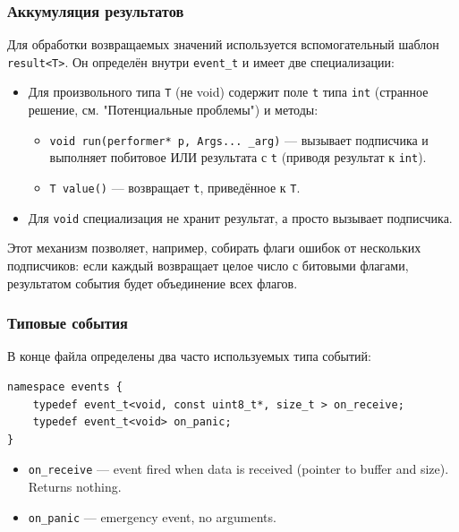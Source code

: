 \documentclass[a4paper,12pt]{article}
\begin{document}
\subsubsection{Аккумуляция результатов}

Для обработки возвращаемых значений используется вспомогательный шаблон \texttt{result<T>}. Он определён внутри \texttt{event\_t} и имеет две специализации:

\begin{itemize}
    \item Для произвольного типа \texttt{T} (не void) содержит поле \texttt{t} типа \texttt{int} (странное решение, см. "Потенциальные проблемы") и методы:
        \begin{itemize}
            \item \texttt{void run(performer* p, Args... \_arg)} — вызывает подписчика и выполняет побитовое ИЛИ результата с \texttt{t} (приводя результат к \texttt{int}).
            \item \texttt{T value()} — возвращает \texttt{t}, приведённое к \texttt{T}.
        \end{itemize}
    \item Для \texttt{void} специализация не хранит результат, а просто вызывает подписчика.
\end{itemize}

Этот механизм позволяет, например, собирать флаги ошибок от нескольких подписчиков: если каждый возвращает целое число с битовыми флагами, результатом события будет объединение всех флагов.

\subsubsection{Типовые события}

В конце файла определены два часто используемых типа событий:

\begin{lstlisting}[caption={Predefined event types}]
namespace events {
    typedef event_t<void, const uint8_t*, size_t > on_receive;
    typedef event_t<void> on_panic;
}
\end{lstlisting}

\begin{itemize}
    \item \texttt{on\_receive} — event fired when data is received (pointer to buffer and size). Returns nothing.
    \item \texttt{on\_panic} — emergency event, no arguments.
\end{itemize}
\end{document}
